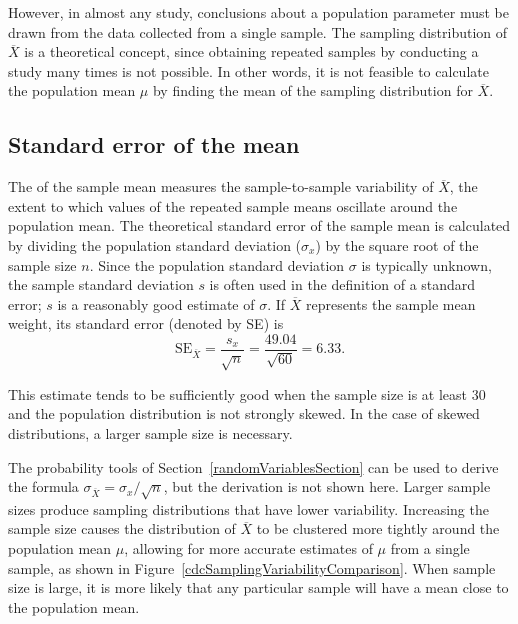 However, in almost any study, conclusions about a population parameter must be drawn from the data collected from a single sample. The sampling distribution of $\overline{X}$ is a theoretical concept, since obtaining repeated samples by conducting a study many times is not possible. In other words, it is not feasible to calculate the population mean $\mu$ by finding the mean of the sampling distribution for $\overline{X}$.

\subsection{Standard error of the mean}
\label{seOfTheMean}

The  of the sample mean measures the sample-to-sample variability of $\overline{X}$, the extent to which values of the repeated sample means oscillate around the population mean. The theoretical standard error of the sample mean is calculated by dividing the population standard deviation ($\sigma_{x}$) by the square root of the sample size $n$. Since the population standard deviation $\sigma$ is typically unknown, the sample standard deviation $s$ is often used in the definition of a standard error; $s$ is a reasonably good estimate of $\sigma$. If $\overline{X}$ represents the sample mean weight, its standard error (denoted by SE) is
\[\text{SE}_{\overline{X}} = \dfrac{s_{x}}{\sqrt{n}} = \dfrac{49.04}{\sqrt{60}} = 6.33. \]

This estimate tends to be sufficiently good when the sample size is at least 30 and the population distribution is not strongly skewed. In the case of skewed distributions, a larger sample size is necessary.

The probability tools of Section~\ref{randomVariablesSection} can be used to derive the formula $\sigma_{\overline{X}} = \sigma_x/\sqrt{n}$, but the derivation is not shown here. Larger sample sizes produce sampling distributions that have lower variability. Increasing the sample size causes the distribution of $\overline{X}$ to be clustered more tightly around the population mean $\mu$, allowing for more accurate estimates of $\mu$ from a single sample, as shown in Figure~\ref{cdcSamplingVariabilityComparison}. When sample size is large, it is more likely that any particular sample will have a mean close to the population mean. 

